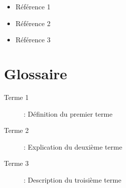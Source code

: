 \documentclass{modern-report}
\begin{document}
\begin{itemize}
    \item Référence 1
    \item Référence 2
    \item Référence 3
\end{itemize}

\section{Glossaire}

\begin{description}
    \item[Terme 1] : Définition du premier terme
    \item[Terme 2] : Explication du deuxième terme
    \item[Terme 3] : Description du troisième terme
\end{description}

\end{document}

